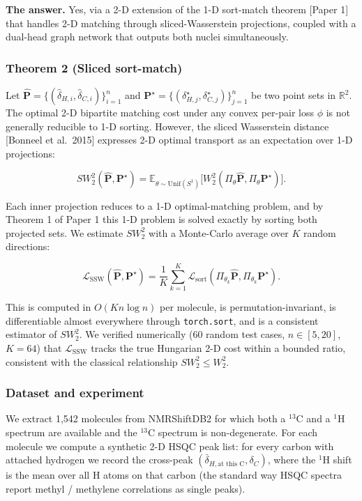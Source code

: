\textbf{The answer.} Yes, via a 2-D extension of the 1-D sort-match theorem {[}Paper 1{]} that handles 2-D matching through sliced-Wasserstein projections, coupled with a dual-head graph network that outputs both nuclei simultaneously.

\subsubsection{Theorem 2 (Sliced sort-match)}\label{theorem-2-sliced-sort-match}

Let \(\hat{\mathbf{P}} = \{(\hat{\delta}_{H,i}, \hat{\delta}_{C,i})\}_{i=1}^n\) and \(\mathbf{P}^\star = \{(\delta^\star_{H,j}, \delta^\star_{C,j})\}_{j=1}^n\) be two point sets in \(\mathbb{R}^2\). The optimal 2-D bipartite matching cost under any convex per-pair loss \(\phi\) is not generally reducible to 1-D sorting. However, the sliced Wasserstein distance {[}Bonneel et al.~2015{]} expresses 2-D optimal transport as an expectation over 1-D projections:

\[SW_2^2(\hat{\mathbf{P}}, \mathbf{P}^\star) = \mathbb{E}_{\theta \sim \mathrm{Unif}(S^1)}\big[ W_2^2(\Pi_\theta \hat{\mathbf{P}}, \Pi_\theta \mathbf{P}^\star) \big].\]

Each inner projection reduces to a 1-D optimal-matching problem, and by Theorem 1 of Paper 1 this 1-D problem is solved exactly by sorting both projected sets. We estimate \(SW_2^2\) with a Monte-Carlo average over \(K\) random directions:

\[\mathcal{L}_{\mathrm{SSW}}(\hat{\mathbf{P}}, \mathbf{P}^\star) = \frac{1}{K} \sum_{k=1}^K \mathcal{L}_{\mathrm{sort}}(\Pi_{\theta_k}\hat{\mathbf{P}}, \Pi_{\theta_k}\mathbf{P}^\star).\]

This is computed in \(O(K n \log n)\) per molecule, is permutation-invariant, is differentiable almost everywhere through \texttt{torch.sort}, and is a consistent estimator of \(SW_2^2\). We verified numerically (60 random test cases, \(n \in [5, 20]\), \(K = 64\)) that \(\mathcal{L}_{\mathrm{SSW}}\) tracks the true Hungarian 2-D cost within a bounded ratio, consistent with the classical relationship \(SW_2^2 \leq W_2^2\).

\subsubsection{Dataset and experiment}\label{dataset-and-experiment}

We extract 1,542 molecules from NMRShiftDB2 for which both a \(^{13}\)C and a \(^{1}\)H spectrum are available and the \(^{13}\)C spectrum is non-degenerate. For each molecule we compute a synthetic 2-D HSQC peak list: for every carbon with attached hydrogen we record the cross-peak \((\bar{\delta}_{H,\text{at this C}}, \delta_{C})\), where the \(^{1}\)H shift is the mean over all H atoms on that carbon (the standard way HSQC spectra report methyl / methylene correlations as single peaks).

